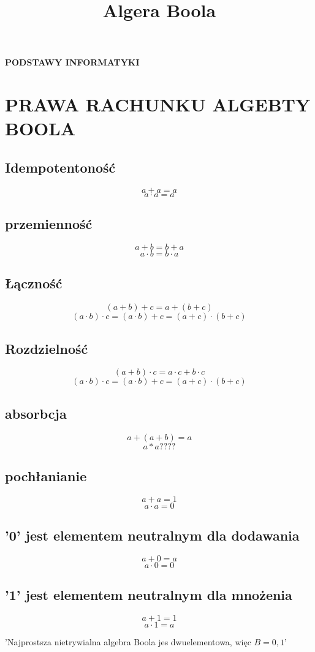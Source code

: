 \documentclass{article}
\title{Algera Boola}
\begin{document}
\begin{titlepage}
    \begin{center}
        \vspace*{1cm}
        
        \Huge

        \textbf{PODSTAWY INFORMATYKI}
        
        \vspace{3cm}
    \end{center}
\end{titlepage}
\newpage
\section{PRAWA RACHUNKU ALGEBTY BOOLA}
\subsection{Idempotentoność}
\[a + a = a\]
\[a \cdot a = a\]
\subsection{przemienność}
\[a + b = b + a\]
\[a \cdot b = b \cdot a\]
\subsection{Łączność}
\[(a + b) + c = a + (b + c)\]
\[(a \cdot b) \cdot c = (a \cdot b) + c = (a + c) \cdot (b + c)\]
\subsection{Rozdzielność}
\[(a + b) \cdot c = a \cdot c + b \cdot c\]
\[(a \cdot b) \cdot c = (a \cdot b) + c = (a + c) \cdot (b + c)\]
\subsection{absorbcja}
\[a + (a + b) = a\]
\[a * a ????\]
\subsection{pochłanianie}
\[a + a = 1\]
\[a \cdot a = 0\]
\subsection{'0' jest elementem neutralnym dla dodawania}
\[a + 0 = a\]
\[a \cdot 0 = 0\]
\subsection{'1' jest elementem neutralnym dla mnożenia}
\[a + 1 = 1\]
\[a \cdot 1 = a\]

'Najprostsza nietrywialna algebra Boola jes dwuelementowa, więc $B = {0,1}$'
\end{document}
